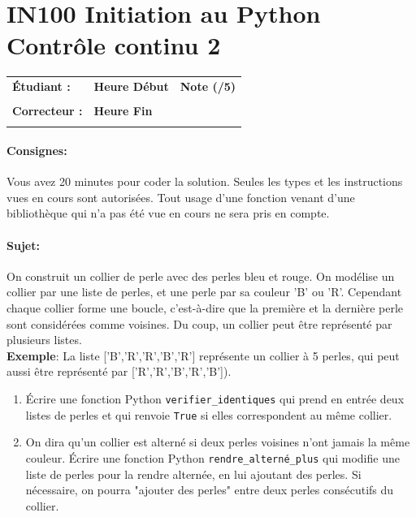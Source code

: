 \documentclass[a4paper,11pt]{article}
\begin{document}
\newpage

\section*{\center IN100 Initiation au Python\\
Contrôle continu 2}

\vspace{0.3 cm}

\begin{table}[h!]
\centering
\renewcommand{\arraystretch}{1.4} %
\begin{tabular}{|p{10cm}|p{3cm}|p{2cm}|}
\hline
\textbf{Étudiant :} & \textbf{Heure Début }  & \textbf{Note (/5) }  \\
& & \\
\hline
\textbf{Correcteur :} & \textbf{Heure Fin } & \\
& & \\
\hline

\hline
\end{tabular}
\end{table}

\paragraph*{Consignes:} Vous avez 20 minutes pour coder la solution. Seules les types et les instructions vues en cours sont autorisées. Tout usage d'une fonction 
venant d'une bibliothèque qui n'a pas été vue en cours ne sera pris en compte. 

\paragraph*{Sujet:}

On construit un collier de perle avec des perles bleu et rouge. On modélise un collier par une liste de perles, et une perle par sa couleur 'B' ou 'R'. Cependant chaque collier forme une boucle, c’est-à-dire que la première et la dernière perle sont considérées comme voisines.
Du coup, un collier peut être représenté par plusieurs listes.\\


\textbf{Exemple}: 
 La liste ['B','R','R','B','R'] représente un collier à 5 perles, qui peut aussi être représenté par ['R','R','B','R','B']).\\


\begin{enumerate}
  \item[1.] Écrire une fonction Python \texttt{verifier\_identiques} qui prend en entrée deux listes de perles et qui renvoie \texttt{True} si elles correspondent au même collier. 
  
  \item[2.] On dira qu'un collier est alterné si deux perles voisines n'ont jamais la même couleur. Écrire une fonction Python \texttt{rendre\_alterné\_plus} qui modifie une liste de perles pour la rendre alternée, en lui ajoutant des perles.  
  Si nécessaire, on pourra "ajouter des perles" entre deux perles consécutifs du collier. 
 \end{enumerate}
 
\end{document}

